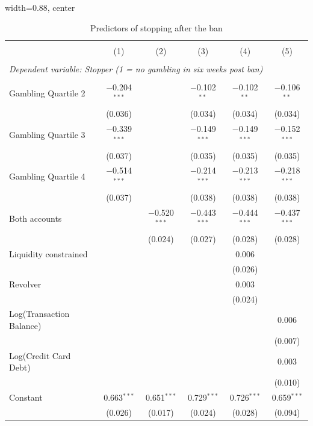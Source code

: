 \documentclass[11pt]{article}
\begin{document}
\begin{table}[!htbp]
\centering
\caption{Predictors of stopping after the ban}
\label{tab:stoppers}
\begin{adjustbox}{width=0.88\textwidth, center}
\begin{threeparttable}
\scriptsize
\begin{tabular}{@{\extracolsep{5pt}}lccccc}
\\[-1.8ex]\hline
\hline \\[-1.8ex]
 & (1) & (2) & (3) & (4) & (5) \\
\hline \\[-1.8ex]
\multicolumn{6}{l}{\textit{Dependent variable: Stopper (1 = no gambling in six weeks post ban)}} \\
\hline \\[-1.8ex]
Gambling Quartile 2  & $-$0.204$^{***}$ &  & $-$0.102$^{**}$ & $-$0.102$^{**}$ & $-$0.106$^{**}$ \\
 & (0.036) &  & (0.034) & (0.034) & (0.034) \\[0.4em]
Gambling Quartile 3 & $-$0.339$^{***}$ &  & $-$0.149$^{***}$ & $-$0.149$^{***}$ & $-$0.152$^{***}$ \\
 & (0.037) &  & (0.035) & (0.035) & (0.035) \\[0.4em]
Gambling Quartile 4 & $-$0.514$^{***}$ &  & $-$0.214$^{***}$ & $-$0.213$^{***}$ & $-$0.218$^{***}$ \\
 & (0.037) &  & (0.038) & (0.038) & (0.038) \\[0.4em]
Both accounts &  & $-$0.520$^{***}$ & $-$0.443$^{***}$ & $-$0.444$^{***}$ & $-$0.437$^{***}$ \\
 &  & (0.024) & (0.027) & (0.028) & (0.028) \\[0.4em]
Liquidity constrained &  &  &  & 0.006 &  \\
 &  &  &  & (0.026) &  \\[0.4em]
Revolver &  &  &  & 0.003 &  \\
 &  &  &  & (0.024) &  \\[0.4em]
Log(Transaction Balance) &  &  &  &  & 0.006 \\
 &  &  &  &  & (0.007) \\[0.4em]
Log(Credit Card Debt) &  &  &  &  & 0.003 \\
 &  &  &  &  & (0.010) \\[0.4em]
Constant & 0.663$^{***}$ & 0.651$^{***}$ & 0.729$^{***}$ & 0.726$^{***}$ & 0.659$^{***}$ \\
 & (0.026) & (0.017) & (0.024) & (0.028) & (0.094) \\[0.4em]

\end{tabular}
\end{threeparttable}
\end{adjustbox}
\end{table}
\end{document}
